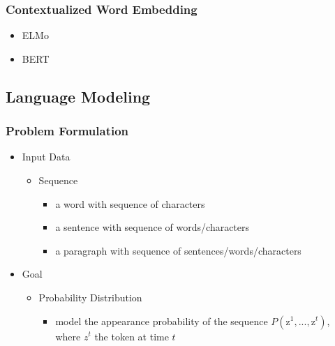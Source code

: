 \subsubsection{Contextualized Word Embedding}
\begin{itemize}
\item ELMo
\item BERT
\end{itemize}

\subsection{Language Modeling}
\subsubsection{Problem Formulation}
\begin{itemize}
\item Input Data
	\begin{itemize}
	\item Sequence
		\begin{itemize}
		\item a word with sequence of characters
		\item a sentence with sequence of words/characters
		\item a paragraph with sequence of sentences/words/characters
		\end{itemize}
	\end{itemize}
\item Goal
	\begin{itemize}
	\item Probability Distribution
		\begin{itemize}
		\item model the appearance probability of the sequence $P(\text{z}^1,...,\text{z}^{t})$, \\
		where $z^t$ the token at time $t$
		\end{itemize}
	\end{itemize}
\end{itemize}

